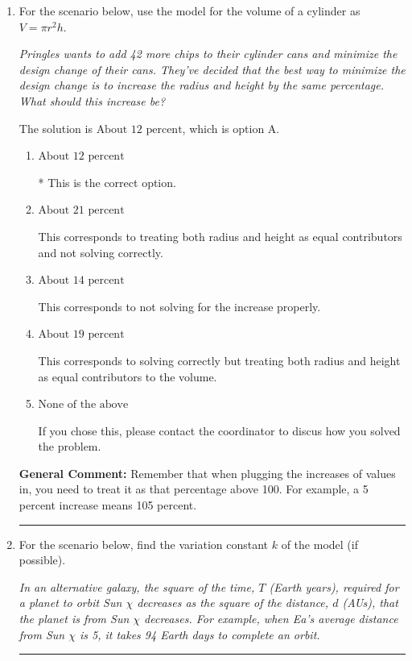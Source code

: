 \documentclass{extbook}[14pt]
\newcommand{\litem}[1]{\item #1

\rule{\textwidth}{0.4pt}}
\begin{document}
\begin{enumerate}\litem{
For the scenario below, use the model for the volume of a cylinder as $V = \pi r^2 h$.

\begin{center}
    \textit{ Pringles wants to add 42 \text{percent} more chips to their cylinder cans and minimize the design change of their cans. They've decided that the best way to minimize the design change is to increase the radius and height by the same percentage. What should this increase be? }
\end{center}


The solution is \( \text{About } 12 \text{ percent} \), which is option A.\begin{enumerate}[label=\Alph*.]
\item \( \text{About } 12 \text{ percent} \)

* This is the correct option.
\item \( \text{About } 21 \text{ percent} \)

This corresponds to treating both radius and height as equal contributors and not solving correctly.
\item \( \text{About } 14 \text{ percent} \)

This corresponds to not solving for the increase properly.
\item \( \text{About } 19 \text{ percent} \)

This corresponds to solving correctly but treating both radius and height as equal contributors to the volume.
\item \( \text{None of the above} \)

If you chose this, please contact the coordinator to discus how you solved the problem.
\end{enumerate}

\textbf{General Comment:} Remember that when plugging the increases of values in, you need to treat it as that percentage above 100. For example, a 5 percent increase means 105 percent.
}
\litem{
For the scenario below, find the variation constant $k$ of the model (if possible).

\begin{center}
    \textit{ In an alternative galaxy, the square of the time, $T$ (Earth years), required for a planet to orbit Sun $\chi$ decreases as the square of the distance, $d$ (AUs), that the planet is from Sun $\chi$ decreases. For example, when Ea's average distance from Sun $\chi$ is 5, it takes 94 Earth days to complete an orbit. }
\end{center}


}
\end{enumerate}
\end{document}
